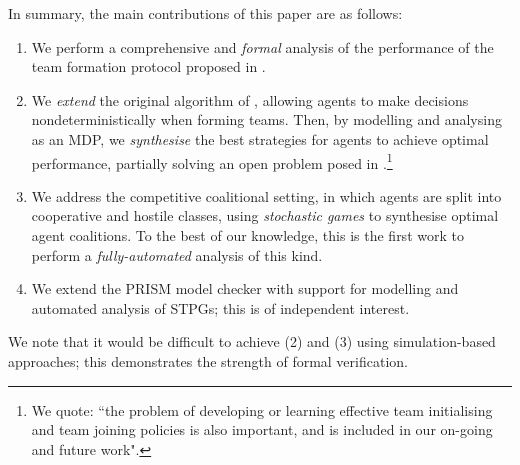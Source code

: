 \documentclass{llncs}
\newcommand{\comment}[1]{\marginpar{\footnotesize \color{red} \textsf{#1}}}
\begin{document}
%


In summary, the main contributions of this paper are as follows:
\begin{enumerate}
  \renewcommand{\labelenumi}{(\arabic{enumi})}
  \item We perform a comprehensive and \emph{formal} analysis of the performance of the team formation protocol proposed in \cite{gaston2005agent}.

  \item  We \emph{extend} the original algorithm of \cite{gaston2005agent}, allowing agents to make decisions nondeterministically when forming teams. Then, by modelling and analysing as an MDP, we \emph{synthesise} the best strategies for agents to achieve optimal performance, partially solving an open problem posed in \cite{gaston2005agent}.\footnote{We quote: ``the problem of developing or learning effective team initialising and team joining policies is also important, and is included in our on-going and future work".}

  \item  We address the competitive coalitional setting, in which agents are split into cooperative and hostile classes, using \emph{stochastic games} to synthesise optimal agent coalitions. To the best of our knowledge, this is the first work to perform a \emph{fully-automated} analysis of this kind.

  \item We extend the  PRISM model checker with support for modelling and automated analysis of STPGs;
  this is of independent interest.
\end{enumerate}
%
We note that it would be difficult to achieve (2) and (3) using simulation-based approaches;
this demonstrates the strength of formal verification.
\end{document}
